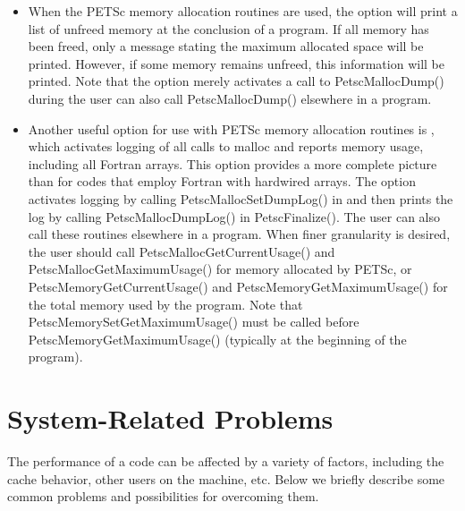 {{\begin{itemize}
\item When the PETSc memory allocation routines are used, the option
 will print a list of unfreed memory at the conclusion of a
program.  If all memory has been freed, only a message stating
the maximum allocated space will be printed.  However, if some memory
remains unfreed, this information will be printed.  Note that the
option  merely activates a call to PetscMallocDump() during
 the user can also call PetscMallocDump() elsewhere
in a program.

\item Another useful option for use with PETSc memory allocation
routines is , which activates logging of all calls
to malloc and reports memory usage, including all Fortran arrays.
This option provides a more complete picture than  for
codes that employ Fortran with hardwired arrays.  The option
 activates logging by calling PetscMallocSetDumpLog() in
 and then prints the log by calling PetscMallocDumpLog()
in PetscFinalize().  The user can also call these routines elsewhere in a
program.  When finer granularity is desired, the user should call
PetscMallocGetCurrentUsage() and PetscMallocGetMaximumUsage() for memory
allocated by PETSc, or PetscMemoryGetCurrentUsage() and
PetscMemoryGetMaximumUsage() for the total memory used by the program.
Note that PetscMemorySetGetMaximumUsage() must be called before
PetscMemoryGetMaximumUsage() (typically at the beginning of the program).

\end{itemize}

%
%
\section{System-Related Problems}

The performance of a code can be affected by a variety of factors,
including the cache behavior, other users on the machine, etc.
Below we briefly describe some common problems and possibilities for
overcoming them.

}}
